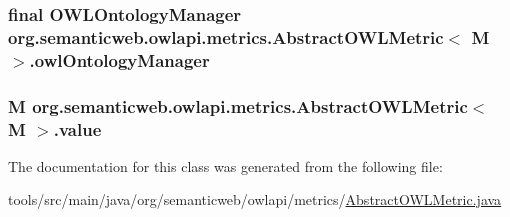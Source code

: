 \hypertarget{classorg_1_1semanticweb_1_1owlapi_1_1metrics_1_1_abstract_o_w_l_metric_3_01_m_01_4_ad33c9afc47b32a87d47cd0c02dc120b1}{
\subsubsection[{owl\-Ontology\-Manager}]{\setlength{\rightskip}{0pt plus 5cm}final {\bf O\-W\-L\-Ontology\-Manager} org.\-semanticweb.\-owlapi.\-metrics.\-Abstract\-O\-W\-L\-Metric$<$ M $>$.owl\-Ontology\-Manager\hspace{0.3cm}{\ttfamily [private]}}}\label{classorg_1_1semanticweb_1_1owlapi_1_1metrics_1_1_abstract_o_w_l_metric_3_01_m_01_4_ad33c9afc47b32a87d47cd0c02dc120b1}
\hypertarget{classorg_1_1semanticweb_1_1owlapi_1_1metrics_1_1_abstract_o_w_l_metric_3_01_m_01_4_a29dcad7f5305f755737b0e8e79962b74}{
\subsubsection[{value}]{\setlength{\rightskip}{0pt plus 5cm}M org.\-semanticweb.\-owlapi.\-metrics.\-Abstract\-O\-W\-L\-Metric$<$ M $>$.value\hspace{0.3cm}{\ttfamily [private]}}}\label{classorg_1_1semanticweb_1_1owlapi_1_1metrics_1_1_abstract_o_w_l_metric_3_01_m_01_4_a29dcad7f5305f755737b0e8e79962b74}


The documentation for this class was generated from the following file\-:\begin{DoxyCompactItemize}
\item 
tools/src/main/java/org/semanticweb/owlapi/metrics/\hyperlink{_abstract_o_w_l_metric_8java}{Abstract\-O\-W\-L\-Metric.\-java}\end{DoxyCompactItemize}
